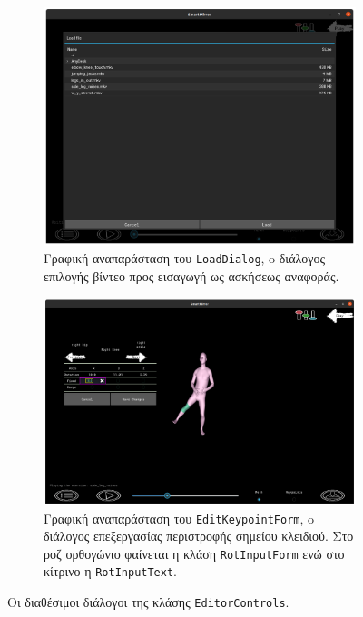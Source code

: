 \begin{figure}[h]
	\centering
	\begin{subfigure}[h]{0.45\textwidth}
	\centering
		\includegraphics[width=\textwidth]{images/chapter5/load_dialog.png}
		\caption{Γραφική αναπαράσταση του \texttt{LoadDialog}, o διάλογος επιλογής βίντεο προς εισαγωγή ως ασκήσεως αναφοράς.}
		\label{fig:load_dialog_ui}
	\end{subfigure}
	\hfill
	\begin{subfigure}[h]{0.45\textwidth}
	\centering
		\includegraphics[width=\textwidth]{images/chapter5/editing_form.png}
		\caption{Γραφική αναπαράσταση του \texttt{EditKeypointForm}, o διάλογος επεξεργασίας περιστροφής σημείου κλειδιού. Στο ροζ ορθογώνιο φαίνεται η κλάση \texttt{RotInputForm} ενώ στο κίτρινο η \texttt{RotInputText}.}
		\label{fig:edit_keypoint}
	\end{subfigure}
	\caption{Οι διαθέσιμοι διάλογοι της κλάσης \texttt{EditorControls}.}
	\label{fig:editor_dialogs}
\end{figure}

